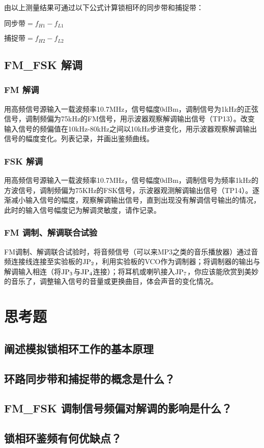 \documentclass{../source/Experiment}
\begin{document}
        由以上测量结果可通过以下公式计算锁相环的同步带和捕捉带：

        $
        \mbox{同步带} = f_{H1} - f_{L1}
        $

        $
        \mbox{捕捉带} = f_{H2} - f_{L2}
        $

        \subsection{FM\_FSK 解调 }
            \subsubsection{FM 解调}
            用高频信号源输入一载波频率10.7MHz，信号幅度0dBm，调制信号为1kHz的正弦信号，调制频偏为75kHz的FM信号，用示波器观察解调输出信号（TP13）。改变输入信号的频偏值在10kHz-80kHz之间以10kHz步进变化，用示波器观察解调输出信号的幅度变化。列表记录，并画出鉴频曲线。
            \subsubsection{FSK 解调}
            用高频信号源输入一载波频率10.7MHz，信号幅度0dBm，调制信号为频率1kHz的方波信号，调制频偏为75KHz的FSK信号，示波器观测解调输出信号（TP14）。逐渐减小输入信号的幅度，观察解调输出信号，直到出现没有解调信号输出的情况，此时的输入信号幅度记为解调灵敏度，请作记录。
            \subsubsection{FM 调制、解调联合试验}

            FM调制、解调联合试验时，将音频信号（可以来MP3之类的音乐播放器）通过音频连接线连接至实验板的$\rm JP_2$，利用实验板的VCO作为调制器；将调制器的输出与解调输入相连（将$\rm JP_3$与$\rm JP_4$连接）；将耳机或喇叭接入$\rm JP_7$，你应该能欣赏到美妙的音乐了，调整输入信号的音量或更换曲目，体会声音的变化情况。
            
    \section{思考题}
	    \subsection{阐述模拟锁相环工作的基本原理 }
       
        \subsection{环路同步带和捕捉带的概念是什么？}
        
        \subsection{FM\_FSK 调制信号频偏对解调的影响是什么？}

        \subsection{锁相环鉴频有何优缺点？}
\end{document}
